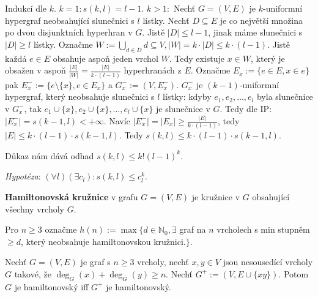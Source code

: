 \begin{dukaz}
	Indukcí dle $k$. $k=1: s(k,l) = l -1$. $k > 1:$ Nechť $G= (V,E)$ je $k$-uniformní hypergraf neobsahující slunečnici s $l$ lístky. Nechť $D \subseteq E$ je co největší množina po dvou disjunktních hyperhran v $G$. Jistě $|D| \leq l - 1$, jinak máme slunečnici s $|D| \geq l$ lístky. Označme $W := \bigcup_{d \in D} d \subseteq V, |W| = k \cdot |D| \leq k \cdot (l - 1)$. Jistě každá $e \in E$ obsahuje aspoň jeden vrchol $W$. Tedy existuje $x \in W$, který je obsažen v aspoň $\frac{|E|}{|W|} = \frac{|E|}{k \cdot(l-1)}$ hyperhranách z $E$. Označme $E_{x} := \{ e \in E, x \in e\}$ pak $E_{x}^{-} := \{ e \setminus \{x\}, e \in E_{x}\}$ a $G_{x}^{-} := (V,E_{x}^{-})$. $G_{x}^{-}$ je $(k-1)$-uniformní hypergraf, který neobsahuje slunečnici s $l$ lístky: kdyby $e_{1},e_{2}, \dots ,e_{l}$ byla slunečnice v $G_{x}^{-}$, tak $e_{1} \cup \{x\}, e_{2} \cup \{x\}, \dots, e_{l} \cup \{x\}$ je slunečnice v $G$. Tedy dle IP: $|E_{x}^{-}| = s(k-1,l) < + \infty$. Navíc $|E_{x}^{-}| = |E_{x}| \geq \frac{|E|}{k \cdot (l-1)}$, tedy $|E| \leq k \cdot (l-1) \cdot s(k-1,l)$. Tedy $s(k,l) \leq k \cdot (l-1) \cdot s(k-1,l)$.
\end{dukaz}

\begin{pozn}
	Důkaz nám dává odhad $s(k,l) \leq k!(l-1)^{k}$.
\end{pozn}

\textit{Hypotéza}: $(\forall l)(\exists c_{l}): s(k,l) \leq c_{l}^{k}$.

\begin{definice}
	\textbf{Hamiltonovská kružnice} v grafu $G = (V,E)$ je kružnice v $G$ obsahující všechny vrcholy $G$.
\end{definice}

\begin{definice}
	Pro $n \geq 3$ označme $h(n) := \max \{d \in \mathbb{N}_{0}, \exists$ graf na $n$ vrcholech s min stupněm $\geq d$, který neobsahuje hamiltonovskou kružnici.$\}$.
\end{definice}

\begin{veta}
	Nechť $G = (V,E)$ je graf s $n \geq 3$ vrcholy, nechť $x,y \in V$ jsou nesousedící vrcholy $G$ takové, že $\deg_{G}(x) + \deg_{G}(y) \geq n$. Nechť $G^{+}:= (V,E\cup\{xy\})$. Potom $G$ je hamiltonovský iff $G^{+}$ je hamiltonovský.
\end{veta}

